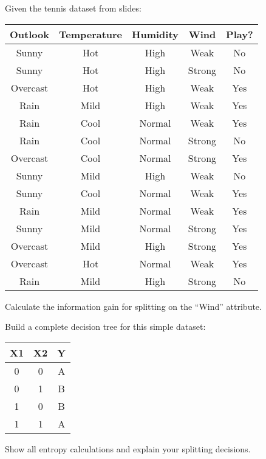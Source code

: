\documentclass{article}
\newcounter{exercise}
\begin{document}
\begin{tcolorbox}[colback=gray!5!white,colframe=gray!75!black,title=Problem \stepcounter{exercise}: Information Gain Calculation]

Given the tennis dataset from slides:
\begin{center}
\begin{tabular}{|c|c|c|c|c|}
\hline
\textbf{Outlook} & \textbf{Temperature} & \textbf{Humidity} & \textbf{Wind} & \textbf{Play?} \\
\hline
Sunny & Hot & High & Weak & No \\
Sunny & Hot & High & Strong & No \\
Overcast & Hot & High & Weak & Yes \\
Rain & Mild & High & Weak & Yes \\
Rain & Cool & Normal & Weak & Yes \\
Rain & Cool & Normal & Strong & No \\
Overcast & Cool & Normal & Strong & Yes \\
Sunny & Mild & High & Weak & No \\
Sunny & Cool & Normal & Weak & Yes \\
Rain & Mild & Normal & Weak & Yes \\
Sunny & Mild & Normal & Strong & Yes \\
Overcast & Mild & High & Strong & Yes \\
Overcast & Hot & Normal & Weak & Yes \\
Rain & Mild & High & Strong & No \\
\hline
\end{tabular}
\end{center}

Calculate the information gain for splitting on the ``Wind'' attribute.
\end{tcolorbox}

\begin{tcolorbox}[colback=gray!5!white,colframe=gray!75!black,title=Problem \stepcounter{exercise}: Tree Construction]

Build a complete decision tree for this simple dataset:
\begin{center}
\begin{tabular}{|c|c|c|}
\hline
\textbf{X1} & \textbf{X2} & \textbf{Y} \\
\hline
0 & 0 & A \\
0 & 1 & B \\
1 & 0 & B \\
1 & 1 & A \\
\hline
\end{tabular}
\end{center}

Show all entropy calculations and explain your splitting decisions.
\end{tcolorbox}
\end{document}
